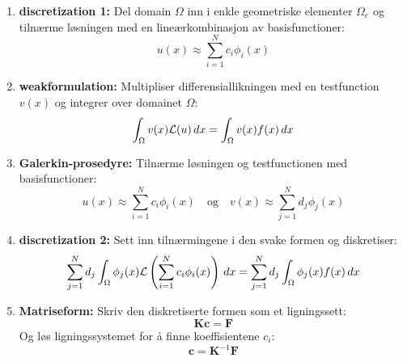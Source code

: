 \begin{enumerate}
  \item \textbf{\gls{discretization} 1:} Del \gls{domain} \( \Omega \) inn i enkle geometriske elementer \( \Omega_e \) og tilnærme løsningen med en lineærkombinasjon av \gls{basisfunction}er:
        \[
          u(x) \approx \sum_{i=1}^N c_i \phi_i(x)
        \]
  \item \textbf{\gls{weakformulation}:} Multipliser differensiallikningen med en \gls{testfunction} \( v(x) \) og integrer over \gls{domain}et \( \Omega \):
        \[
          \int_\Omega v(x) \mathcal{L}(u) \, dx = \int_\Omega v(x) f(x) \, dx
        \]

  \item \textbf{Galerkin-prosedyre:} Tilnærme løsningen og \gls{testfunction}en med \gls{basisfunction}er:
        \[
          u(x) \approx \sum_{i=1}^N c_i \phi_i(x) \quad \text{og} \quad v(x) \approx \sum_{j=1}^N d_j \phi_j(x)
        \]
  \item \textbf{\gls{discretization} 2:} Sett inn tilnærmingene i den svake formen og diskretiser:
        \[
          \sum_{j=1}^N d_j \int_\Omega \phi_j(x) \mathcal{L} \left( \sum_{i=1}^N c_i \phi_i(x) \right) \, dx = \sum_{j=1}^N d_j \int_\Omega \phi_j(x) f(x) \, dx
        \]
  \item \textbf{Matriseform:} Skriv den diskretiserte formen som et ligningssett:
        \[
          \symbf{K} \symbf{c} = \symbf{F}
        \]
        Og løs ligningssystemet for å finne koeffisientene \(c_i\):
        \[
          \symbf{c} = \symbf{K}^{-1} \symbf{F}
        \]

\end{enumerate}


